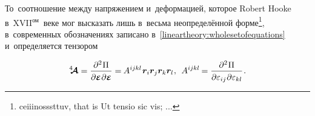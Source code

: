 \begin{otherlanguage}{russian}
\nopagebreak
То~соотношение между напряжением и~деформацией, которое Robert Hooke в~\hbox{XVII$^{\textrm{ом}}$\hspace{-0.12em}}~веке мог высказать лишь в~весьма неопределённой форме\footnote{ceiiinosssttuv, that is Ut tensio sic vis; ...}\hspace{-0.32em},\hspace{0.24em} в~современных обозначениях записано в~\eqref{lineartheory:wholesetofequations} и~определяется тензором

\nopagebreak\vspace{-0.1em}\begin{equation}
\stiffnesstensor =
\displaystyle \frac{\partial^2 \hspace{0.1ex} \Pi}{\raisemath{-0.1em}{\partial \mathboldepsilon \hspace{0.1ex} \partial \mathboldepsilon}} = \hspace{-0.1ex}
A^{ijkl} \hspace{.16ex} \bm{r}_i \bm{r}_j \bm{r}_k \bm{r}_l \hspace{0.1ex}, \:\:
%
A^{ijkl} \hspace{-0.16ex} =
\displaystyle \frac{\partial^2 \hspace{0.1ex} \Pi}{\raisemath{-0.1em}{\partial \varepsilon_{ij} \hspace{0.1ex} \partial \varepsilon_{kl}}} \hspace{0.16ex}.
\end{equation}


\end{otherlanguage}
